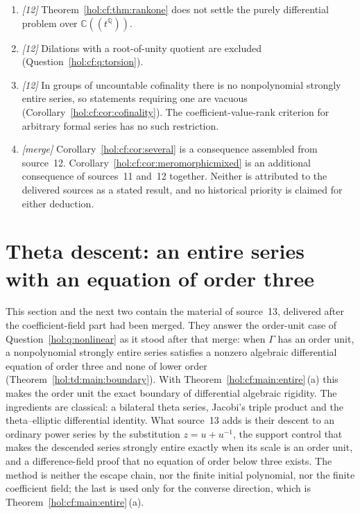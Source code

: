 \documentclass[11pt]{article}
\numberwithin{equation}{section}
\theoremstyle{definition}
\theoremstyle{remark}
\newcommand{\C}{\mathbb C}
\newcommand{\Q}{\mathbb Q}
\begin{document}
\begin{enumerate}[label=\textup{(C\arabic*)}]
\item \emph{[12]} Theorem~\ref{hol:cf:thm:rankone} does not settle the purely
differential problem over $\C((t^\Q))$.
\item \emph{[12]} Dilations with a root-of-unity quotient are excluded
(Question~\ref{hol:cf:q:torsion}).
\item \emph{[12]} In groups of uncountable cofinality there is no
nonpolynomial strongly entire series, so statements requiring one are
vacuous (Corollary~\ref{hol:cf:cor:cofinality}). The coefficient-value-rank
criterion for arbitrary formal series has no such restriction.
\item \emph{[merge]} Corollary~\ref{hol:cf:cor:several} is a consequence
assembled from source~12. Corollary~\ref{hol:cf:cor:meromorphicmixed} is an
additional consequence of sources~11 and~12 together. Neither is attributed
to the delivered sources as a stated result, and no historical priority is
claimed for either deduction.
\end{enumerate}

\section{Theta descent: an entire series with an equation of order three}
\label{hol:td:sec:setting}

This section and the next two contain the material of source~13, delivered
after the coefficient-field part had been merged. They answer the order-unit
case of Question~\ref{hol:q:nonlinear} as it stood after that merge: when
$\Gamma$ has an order unit, a nonpolynomial strongly entire series satisfies a
nonzero algebraic differential equation of order three and none of lower order
(Theorem~\ref{hol:td:main:boundary}). With
Theorem~\ref{hol:cf:main:entire}\,(a) this makes the order unit the exact
boundary of differential algebraic rigidity. The ingredients are classical: a
bilateral theta series, Jacobi's triple product and the theta--elliptic
differential identity. What source~13 adds is their descent to an ordinary
power series by the substitution $z=u+u^{-1}$, the support control that makes
the descended series strongly entire exactly when its scale is an order unit,
and a difference-field proof that no equation of order below three exists.
The method is neither the escape chain, nor the finite initial polynomial, nor
the finite coefficient field; the last is used only for the converse
direction, which is Theorem~\ref{hol:cf:main:entire}\,(a).
\end{document}
